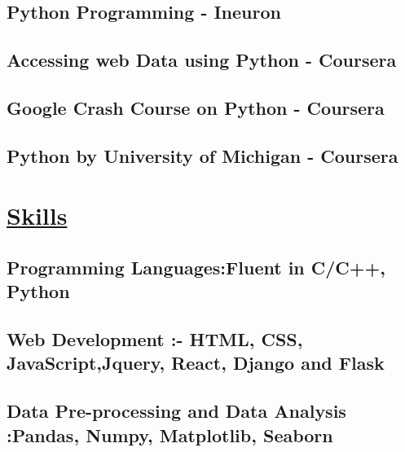\documentclass{article}
\begin{document}
\subsection{\textbf{Python Programming}
    \textmd{- Ineuron}}



\subsection{\textbf{Accessing web Data using Python}
    \textmd{- Coursera}}

\subsection{\textbf{Google Crash Course on Python}
    \textmd{- Coursera}}

\subsection{\textbf{Python by University of Michigan}
    \textmd{- Coursera}}


\section{\underline{Skills}}

\subsection{\textbf{Programming Languages:}\textmd{Fluent in C/C++, Python }}
\subsection{\textbf{Web Development :}\textmd{- HTML, CSS, JavaScript,Jquery, React, Django and Flask}}
\subsection{\textbf{Data Pre-processing and Data Analysis :}\textmd{Pandas, Numpy, Matplotlib, Seaborn }}
\end{document}
